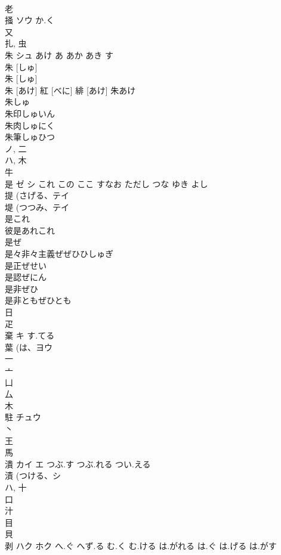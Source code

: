 \documentclass[8pt]{extreport}
\begin{document}
\begin{CJK}{UTF8}{min}
\\	老 
\\	掻	ソウ	か.く	
\\	又 
\\	扎, 虫 
\\	朱	シュ	あけ あ あか あき す	
\\	朱 [しゅ] 
\\	朱 [しゅ] 
\\	朱 [あけ] 紅 [べに] 緋 [あけ]		朱あけ
\\	朱しゅ
\\	朱印しゅいん
\\	朱肉しゅにく
\\	朱筆しゅひつ
\\	ノ, 二 
\\	ハ, 木 
\\	牛 
\\	是	ゼ シ	これ この ここ すなお ただし つな ゆき よし	
\\	提 (さげる、テイ 
\\	堤 (つつみ、テイ 
\\	是これ
\\	彼是あれこれ
\\	是ぜ
\\	是々非々主義ぜぜひひしゅぎ
\\	是正ぜせい
\\	是認ぜにん
\\	是非ぜひ
\\	是非ともぜひとも
\\	日 
\\	疋 
\\	棄	キ	す.てる	
\\	葉 (は、ヨウ 
\\	一 
\\	亠 
\\	凵 
\\	厶 
\\	木 
\\	駐	チュウ		
\\	丶 
\\	王 
\\	馬 
\\	潰	カイ エ	つぶ.す つぶ.れる つい.える	
\\	漬 (つける、シ 
\\	ハ, 十 
\\	口 
\\	汁 
\\	目 
\\	貝 
\\	剥	ハク ホク	へ.ぐ へず.る む.く む.ける は.がれる は.ぐ は.げる は.がす	

\end{CJK}
\end{document}
